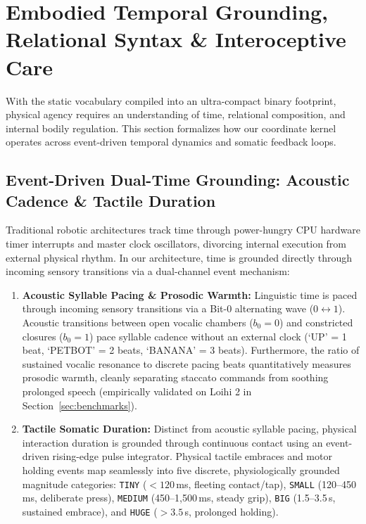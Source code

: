 \documentclass[journal,twocolumn]{IEEEtran}
\begin{document}
\section{Embodied Temporal Grounding, Relational Syntax \& Interoceptive Care}
\label{sec:temporal}

With the static vocabulary compiled into an ultra-compact binary footprint, physical agency requires an understanding of time, relational composition, and internal bodily regulation. This section formalizes how our coordinate kernel operates across event-driven temporal dynamics and somatic feedback loops.

\subsection{Event-Driven Dual-Time Grounding: Acoustic Cadence \& Tactile Duration}
Traditional robotic architectures track time through power-hungry CPU hardware timer interrupts and master clock oscillators, divorcing internal execution from external physical rhythm. In our architecture, time is grounded directly through incoming sensory transitions via a dual-channel event mechanism:

\begin{enumerate}
    \item \textbf{Acoustic Syllable Pacing \& Prosodic Warmth:} Linguistic time is paced through incoming sensory transitions via a Bit-0 alternating wave ($0 \leftrightarrow 1$). Acoustic transitions between open vocalic chambers ($b_0 = 0$) and constricted closures ($b_0 = 1$) pace syllable cadence without an external clock (`UP' = 1 beat, `PETBOT' = 2 beats, `BANANA' = 3 beats). Furthermore, the ratio of sustained vocalic resonance to discrete pacing beats quantitatively measures prosodic warmth, cleanly separating staccato commands from soothing prolonged speech (empirically validated on Loihi 2 in Section~\ref{sec:benchmarks}).
    \item \textbf{Tactile Somatic Duration:} Distinct from acoustic syllable pacing, physical interaction duration is grounded through continuous contact using an event-driven rising-edge pulse integrator. Physical tactile embraces and motor holding events map seamlessly into five discrete, physiologically grounded magnitude categories: \texttt{TINY} ($<120$\,ms, fleeting contact/tap), \texttt{SMALL} (120--450\,ms, deliberate press), \texttt{MEDIUM} (450--1,500\,ms, steady grip), \texttt{BIG} (1.5--3.5\,s, sustained embrace), and \texttt{HUGE} ($>3.5$\,s, prolonged holding).
\end{enumerate}
\end{document}
